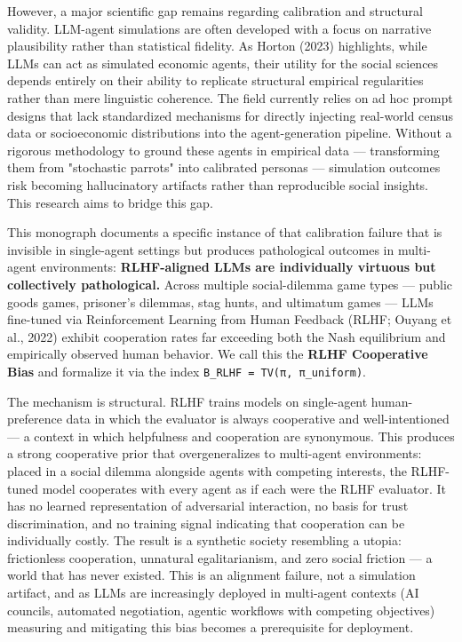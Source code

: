 However, a major scientific gap remains regarding calibration and structural validity. LLM-agent simulations are often developed with a focus on narrative plausibility rather than statistical fidelity. As Horton (2023) highlights, while LLMs can act as simulated economic agents, their utility for the social sciences depends entirely on their ability to replicate structural empirical regularities rather than mere linguistic coherence. The field currently relies on ad hoc prompt designs that lack standardized mechanisms for directly injecting real-world census data or socioeconomic distributions into the agent-generation pipeline. Without a rigorous methodology to ground these agents in empirical data — transforming them from "stochastic parrots" into calibrated personas — simulation outcomes risk becoming hallucinatory artifacts rather than reproducible social insights. This research aims to bridge this gap.

This monograph documents a specific instance of that calibration failure that is invisible in single-agent settings but produces pathological outcomes in multi-agent environments: \textbf{RLHF-aligned LLMs are individually virtuous but collectively pathological.} Across multiple social-dilemma game types — public goods games, prisoner's dilemmas, stag hunts, and ultimatum games — LLMs fine-tuned via Reinforcement Learning from Human Feedback (RLHF; Ouyang et al., 2022) exhibit cooperation rates far exceeding both the Nash equilibrium and empirically observed human behavior. We call this the \textbf{RLHF Cooperative Bias} and formalize it via the index \texttt{B\_RLHF = TV(π, π\_uniform)}.

The mechanism is structural. RLHF trains models on single-agent human-preference data in which the evaluator is always cooperative and well-intentioned — a context in which helpfulness and cooperation are synonymous. This produces a strong cooperative prior that overgeneralizes to multi-agent environments: placed in a social dilemma alongside agents with competing interests, the RLHF-tuned model cooperates with every agent as if each were the RLHF evaluator. It has no learned representation of adversarial interaction, no basis for trust discrimination, and no training signal indicating that cooperation can be individually costly. The result is a synthetic society resembling a utopia: frictionless cooperation, unnatural egalitarianism, and zero social friction — a world that has never existed. This is an alignment failure, not a simulation artifact, and as LLMs are increasingly deployed in multi-agent contexts (AI councils, automated negotiation, agentic workflows with competing objectives) measuring and mitigating this bias becomes a prerequisite for deployment.

